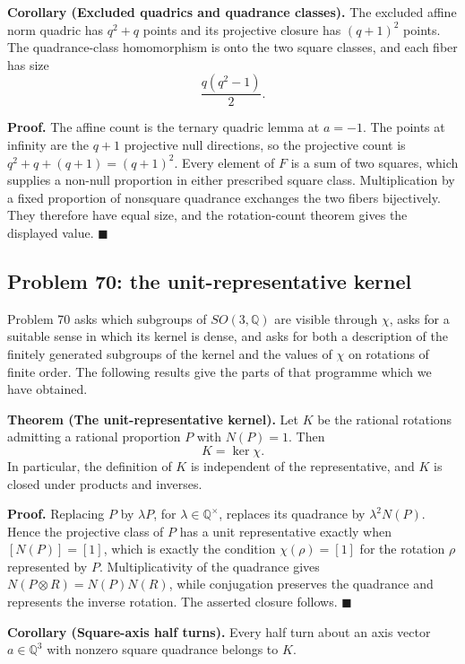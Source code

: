 \documentclass[11pt]{article}
\begin{document}
\medskip
\noindent\textbf{Corollary (Excluded quadrics and quadrance classes).}
The excluded affine norm quadric has \(q^2+q\) points and its projective
closure has \((q+1)^2\) points.  The quadrance-class homomorphism is onto the
two square classes, and each fiber has size
\[
 \frac{q(q^2-1)}2.
\]

\smallskip
\noindent\textbf{Proof.}
The affine count is the ternary quadric lemma at \(a=-1\).  The points at
infinity are the \(q+1\) projective null directions, so the projective count
is \(q^2+q+(q+1)=(q+1)^2\).  Every element of \(F\) is a sum of two squares,
which supplies a non-null proportion in either prescribed square class.
Multiplication by a fixed proportion of nonsquare quadrance exchanges the two
fibers bijectively.  They therefore have equal size, and the rotation-count
theorem gives the displayed value. \hfill\(\blacksquare\)

\subsection{Problem 70: the unit-representative kernel}

Problem 70 asks which subgroups of \(SO(3,\mathbb Q)\) are visible through
\(\chi\), asks for a suitable sense in which its kernel is dense, and asks
for both a description of the finitely generated subgroups of the kernel and
the values of \(\chi\) on rotations of finite order.  The following results
give the parts of that programme which we have obtained.

\medskip
\noindent\textbf{Theorem (The unit-representative kernel).}
Let \(K\) be the rational rotations admitting a rational proportion \(P\)
with \(N(P)=1\).  Then
\[
 K=\ker\chi .
\]
In particular, the definition of \(K\) is independent of the representative,
and \(K\) is closed under products and inverses.

\smallskip
\noindent\textbf{Proof.}
Replacing \(P\) by \(\lambda P\), for
\(\lambda\in\mathbb Q^\times\), replaces its quadrance by
\(\lambda^2N(P)\).  Hence the projective class of \(P\) has a unit
representative exactly when \([N(P)]=[1]\), which is exactly the condition
\(\chi(\rho)=[1]\) for the rotation \(\rho\) represented by \(P\).
Multiplicativity of the quadrance gives
\(N(P\otimes R)=N(P)N(R)\), while conjugation preserves the quadrance and
represents the inverse rotation.  The asserted closure follows.
\hfill\(\blacksquare\)

\medskip
\noindent\textbf{Corollary (Square-axis half turns).}
Every half turn about an axis vector \(a\in\mathbb Q^3\) with nonzero square
quadrance belongs to \(K\).
\end{document}
